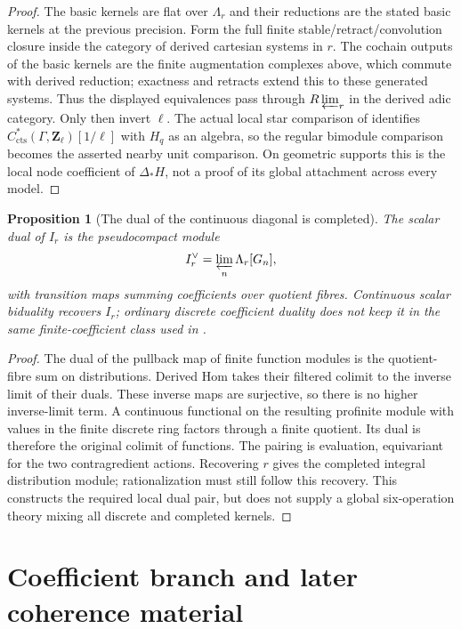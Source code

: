 \documentclass[11pt]{article}
\newtheorem{proposition}{Proposition}[section]
\theoremstyle{definition}
\theoremstyle{remark}
\begin{document}
\begin{proof}
The basic kernels are flat over $\Lambda_r$ and their reductions
are the stated basic kernels at the previous precision.  Form the
full finite stable/retract/convolution closure inside the category
of derived cartesian systems in $r$.  The cochain outputs of the
basic kernels are the finite augmentation complexes above, which
commute with derived reduction; exactness and retracts extend this
to these generated systems.  Thus the displayed equivalences pass
through $R\varprojlim_r$ in the derived adic category.  Only then
invert $\ell$.  The actual local star comparison of \cite{Local}
identifies $C^*_{\mathrm{cts}}(\Gamma,\mathbf Z_\ell)[1/\ell]$
with $H_q$ as an algebra, so the regular bimodule comparison becomes
the asserted nearby unit comparison.  On geometric supports this
is the local node coefficient of $\Delta_*H$, not a proof of its
global attachment across every model.
\end{proof}

\begin{proposition}[The dual of the continuous diagonal is completed]
\label{prop:root-diagonal-completion}
The scalar dual of $I_r$ is the pseudocompact module
\[
 I_r^\vee=\varprojlim_n\Lambda_r[G_n],
\]
with transition maps summing coefficients over quotient fibres.
Continuous scalar biduality recovers $I_r$; ordinary discrete
coefficient duality does not keep it in the same finite-coefficient
class used in \cite{Local}.
\end{proposition}
\begin{proof}
The dual of the pullback map of finite function modules is the
quotient-fibre sum on distributions.  Derived Hom takes their
filtered colimit to the inverse limit of their duals.  These inverse
maps are surjective, so there is no higher inverse-limit term.
A continuous functional on the resulting profinite module with
values in the finite discrete ring factors through a finite quotient.
Its dual is therefore the original colimit of functions.  The
pairing is evaluation, equivariant for the two contragredient
actions.  Recovering $r$ gives the completed integral distribution
module; rationalization must still follow this recovery.  This
constructs the required local dual pair, but does not supply a
global six-operation theory mixing all discrete and completed kernels.
\end{proof}


\section{Coefficient branch and later coherence material}
\end{document}
